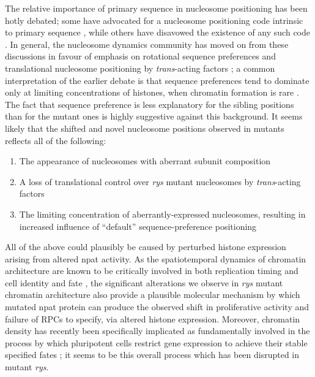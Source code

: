 The relative importance of primary sequence in nucleosome positioning has been hotly debated; some have advocated for a nucleosome positioning code intrinsic to primary sequence \cite{Kaplan2009}, while others have disavowed the existence of any such code \cite{Zhang2009}. In general, the nucleosome dynamics community has moved on from these discussions in favour of emphasis on rotational sequence preferences \cite{Tolstorukov2007} and translational nucleosome positioning by \textit{trans}-acting factors \cite{Klages-Mundt2018}; a common interpretation of the earlier debate is that sequence preferences tend to dominate only at limiting concentrations of histones, when chromatin formation is rare \cite{Pointner2013}. The fact that sequence preference is less explanatory for the sibling positions than for the mutant ones is highly suggestive against this background. It seems likely that the shifted and novel nucleosome positions observed in mutants reflects all of the following:

\begin{enumerate}
    \item The appearance of nucleosomes with aberrant subunit composition
    \item A loss of translational control over \textit{rys} mutant nucleosomes by \textit{trans}-acting factors
    \item The limiting concentration of aberrantly-expressed nucleosomes, resulting in increased influence of ``default'' sequence-preference positioning
\end{enumerate}

All of the above could plausibly be caused by perturbed histone expression arising from altered npat activity. As the spatiotemporal dynamics of chromatin architecture are known to be critically involved in both replication timing \cite{Gilbert2010} and cell identity and fate \cite{Serrano2013}, the significant alterations we observe in \textit{rys} mutant chromatin architecture also provide a plausible molecular mechanism by which mutated npat protein can produce the observed shift in proliferative activity and failure of RPCs to specify, via altered histone expression. Moreover, chromatin density has recently been specifically implicated as fundamentally involved in the process by which pluripotent cells restrict gene expression to achieve their stable specified fates \cite{Golkaram2017}; it seems to be this overall process which has been disrupted in mutant \textit{rys}.

